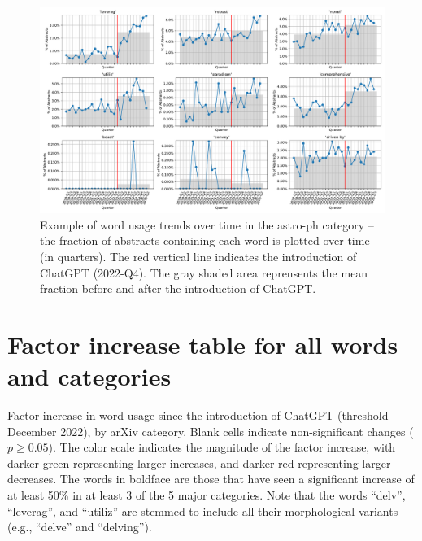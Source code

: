 \documentclass[twocolumn]{aastex701}
\begin{document}
\begin{figure}[ht]
\centering
\includegraphics[width=\textwidth]{scripts/figs/example_usage_vs_time_astro-ph.pdf}
\caption{
Example of word usage trends over time in the astro-ph category -- the fraction of abstracts containing each word is plotted over time (in quarters).
The red vertical line indicates the introduction of ChatGPT (2022-Q4).
The gray shaded area reprensents the mean fraction before and after the introduction of ChatGPT.
}
\label{fig:word_usage_trends_example}
\end{figure}

\section{Factor increase table for all words and categories}
\setcounter{figure}{0}
\setcounter{table}{0}

\begin{table}[ht]
\centering
\scriptsize
\setlength{\tabcolsep}{3pt}

\caption{
Factor increase in word usage since the introduction of ChatGPT (threshold December 2022), by arXiv category.
Blank cells indicate non-significant changes ($p \geq 0.05$).
The color scale indicates the magnitude of the factor increase, with darker green representing larger increases, and darker red representing larger decreases.
The words in boldface are those that have seen a significant increase of at least 50\% in at least 3 of the 5 major categories.
Note that the words ``delv'', ``leverag'', and ``utiliz'' are stemmed to include all their morphological variants (e.g., ``delve'' and ``delving'').
}
\label{tab:factor_increase}
\end{table}
\end{document}
